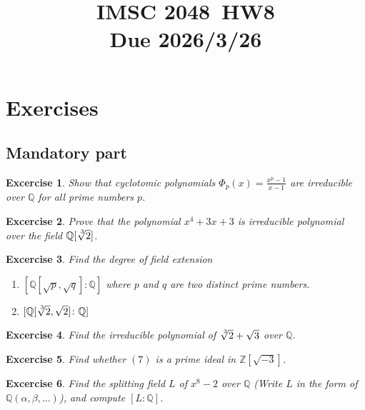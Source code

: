 \documentclass{article}
\title{IMSC 2048\ HW8 \\ Due 2026/3/26}
\newtheorem{exer}{Excercise}
\newcommand{\Z}{\mathbb{Z}}
\newcommand{\Q}{\mathbb{Q}}
\begin{document}
\maketitle

\section{Exercises}
\subsection{Mandatory part}

\begin{exer}
  Show that cyclotomic polynomials $\Phi_p(x)=\frac{x^p-1}{x-1}$ are irreducible over $\Q$ for all prime numbers $p$.
\end{exer}

\begin{exer}
Prove that the polynomial $x^4+3x+3$ is irreducible polynomial over the field $\Q[\sqrt[\leftroot{-2}\uproot{2}3]{2}
]$.
\end{exer}

\begin{exer}

Find the degree of field extension 
\begin{enumerate}
\item $[\Q[\sqrt{p}, \sqrt{q}]\colon \Q]$ where $p$ and $q$ are two distinct prime numbers.
\item $[\Q[\sqrt[\leftroot{-2}\uproot{2}3]{2}, \sqrt{2}]\colon \Q]$
\end{enumerate}

\end{exer}

\begin{exer}
    Find the irreducible polynomial of $\sqrt[\leftroot{-2}\uproot{2}3]{2}+\sqrt{3}$ over $\Q$.
\end{exer}





\begin{exer}
  Find whether $(7)$ is a prime ideal in $\Z[\sqrt{-3}]$.
\end{exer}






\begin{exer}
Find the splitting field $L$ of $x^8 - 2$ over $\Q$ (Write $L$ in the form of $\Q(\alpha, \beta, \dots)$), and compute $[L:\Q]$.
\end{exer}
\end{document}
